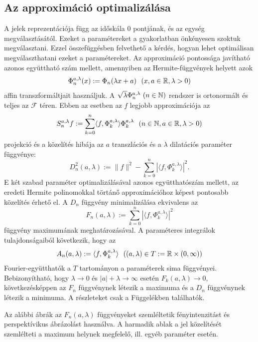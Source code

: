 \documentclass[oneside,titlepage,12pt,a4paper]{report}
\begin{document}
\subsection{Az approximáció optimalizálása} \label{subsec::apropt}

A jelek reprezentációja  függ az időskála $0$ pontjának, és az egység
megválasztásától. Ezeket a paramétereket  a gyakorlatban önkényesen szoktuk
 megválasztani. Ezzel összefüggésben felvethető a kérdés, hogyan lehet optimálisan megválaszthatani  ezeket a paramétereket.
Az  approximáció pontossága javítható azonos együttható szám mellett, amennyiben az  Hermite-függvények helyett azok
\begin{equation}
\Phi_n^{a,\lambda}(x):=\Phi_n(\lambda x+a)\ \  (x,a\in\Bbb R, \lambda>0)
\end{equation}
affin transzformáltjait használjuk. A $\sqrt{\lambda}\Phi_n^{a,\lambda}\ (n\in\Bbb N)$ rendszer is ortonormált és teljes az $\mathcal F$ téren. Ebben az esetben
az $f$ legjobb approximációja az
\begin{equation}
S_n^{a,\lambda}f:=\sum_{k=0}^n\langle f,\Phi_k^{a,\lambda}\rangle\Phi_k^{a,\lambda}\ \
(n\in\Bbb N, a\in\Bbb R,\lambda>0)
\end{equation} \label{eq:hilaprx}
projekció és a közelítés hibája az $a$ transzlációs és a $\lambda$ dilatációs paraméter függvénye:
\begin{equation}
D^2_n(a,\lambda):=\|f\|^2-\sum_{k=0}^n|\langle f,\Phi_k^{a,\lambda}\rangle|^2.
\end{equation}
            E két szabad paraméter optimalizálásával azonos együtthatószám mellett, az eredeti Hermite polinomokkal törtánő  approximációhoz képest pontosabb közelítés érhető el. A $D_n$ függvény minimalizálása ekvivalens  az
 $$
 F_n(a,\lambda):=\sum_{k=0}^n|\langle f,\Phi_k^{a,\lambda}\rangle|^2
 $$
 függvény maximumának meghatározásával. A paraméteres integrálok tulajdonságaiból következik, hogy az
 $$
 A_n(a,\lambda):=\langle f,\Phi_k^{a,\lambda}\rangle \ \  ((a,\lambda)\in T:=\Bbb R\times (0,\infty))
 $$
 Fourier-együtthatók a $T$ tartományon a paraméterek sima függvényei. Bebizonyítható, hogy $\lambda\to 0$ és $|a|+\lambda\to \infty$ esetén
 $F_k(a,\lambda)\to 0$, következésképpen az $F_n$ függvénynek létezik a
 maximuma és a $D_n$ függvénynek létezik a minimuma. A részleteket csak a Függelékben találhatók.

 Az alábbi ábrák az $F_n(a,\lambda)$ függvényeket szemléltetik fényintenzitást és perspektívikus ábrázolást használva. A harmadik ablak
a jel közelítését szemlélteti a maximum helynek megfelelő, ill.  egyéb
paraméter esetén.
\end{document}
